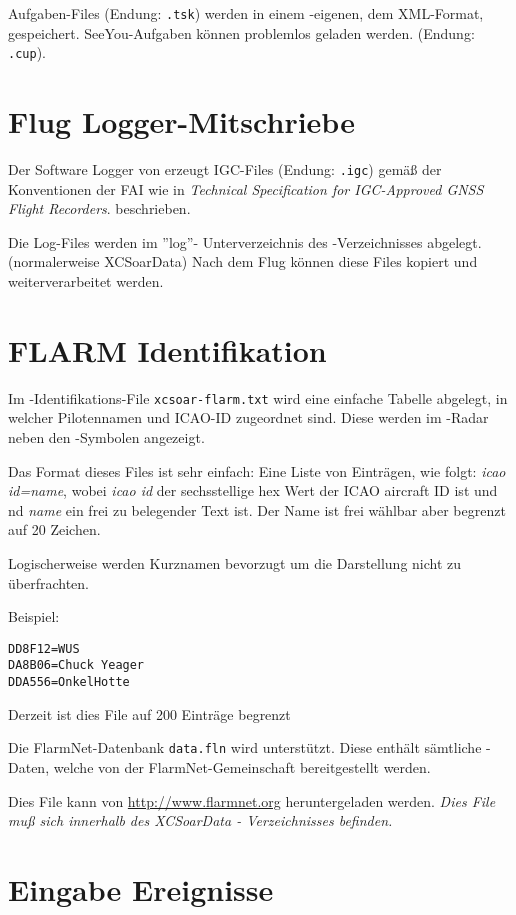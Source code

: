 {{{{Aufgaben-Files  (Endung: \verb|.tsk|) werden in einem \xc -eigenen, dem  XML-Format, gespeichert.
SeeYou-Aufgaben können problemlos geladen werden. (Endung: \verb|.cup|).


\section{Flug Logger-Mitschriebe} \label{sec:logfiles}
Der Software Logger von \xc erzeugt  IGC-Files (Endung: \verb|.igc|)
gemäß der Konventionen der FAI wie in  {\em Technical Specification for IGC-Approved GNSS Flight Recorders}.
beschrieben.

Die Log-Files werden  im ''log''- Unterverzeichnis des \xc -Verzeichnisses abgelegt. (normalerweise XCSoarData)
Nach dem Flug können diese Files kopiert und weiterverarbeitet werden.


\section{FLARM Identifikation}\label{sec:flarm-ident-file}

Im  \fl-Identifikations-File  \verb|xcsoar-flarm.txt| wird eine einfache Tabelle
abgelegt, in welcher Pilotennamen und ICAO-ID zugeordnet sind.
Diese werden im \fl-Radar neben den \fl-Symbolen angezeigt.

Das Format dieses Files ist sehr einfach: Eine Liste von Einträgen, wie folgt:
{\em icao id=name}, wobei {\em icao id} der sechsstellige hex Wert der ICAO
aircraft ID ist und  nd {\em name} ein frei zu belegender Text ist.
Der Name ist frei wählbar aber  begrenzt auf 20 Zeichen.

Logischerweise werden Kurznamen bevorzugt um die Darstellung nicht zu überfrachten.

Beispiel:
\begin{verbatim}
DD8F12=WUS
DA8B06=Chuck Yeager
DDA556=OnkelHotte
\end{verbatim}

Derzeit ist dies File auf 200 Einträge begrenzt

Die  FlarmNet-Datenbank \verb|data.fln| wird unterstützt.
Diese enthält sämtliche \fl-Daten, welche von der \textsf{\textsf{FlarmNet}}-Gemeinschaft bereitgestellt werden.

Dies File kann von  \url{http://www.flarmnet.org}  heruntergeladen werden.
\textsl{Dies File muß sich innerhalb des XCSoarData - Verzeichnisses befinden.}


\section{Eingabe Ereignisse}

}}}}
